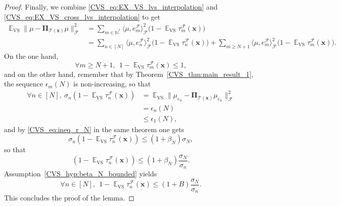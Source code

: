 \documentclass[twoside,11pt]{book}
\numberwithin{theorem}{chapter}
\numberwithin{definition}{chapter}
\numberwithin{proposition}{chapter}
\numberwithin{corollary}{chapter}
\numberwithin{example}{chapter}
\numberwithin{lemma}{chapter}
\numberwithin{assumption}{chapter}
\numberwithin{equation}{chapter}
\numberwithin{figure}{chapter}
\DeclareMathOperator{\VS}{\mathrm{VS}}
\DeclareMathOperator{\EX}{\mathbb{E}}
\DeclareMathOperator{\F}{\mathcal{F}}
\begin{document}
\begin{proof}
Finally, we combine \eqref{CVS_eq:EX_VS_lvs_interpolation} and \eqref{CVS_eq:EX_VS_cross_lvs_interpolation} to get
\begin{align}
\EX_{\VS}\|\mu - \bm{\Pi}_{\mathcal{T}(\bm{x})} \mu\|_{\F}^{2} & = \sum\limits_{m \in \mathbb{N}^{*}} \langle \mu, e_{m}^{\F} \rangle_{\F}^{2}\bigg(1- \EX_{\VS}\tau_{m}^{\F}(\bm{x})\bigg) \nonumber\\
& = \sum\limits_{n \in [N]} \langle \mu, e_{n}^{\F} \rangle_{\F}^{2}\bigg(1- \EX_{\VS}\tau_{n}^{\F}(\bm{x})\bigg) + \sum\limits_{m \geq N+1} \langle \mu, e_{m}^{\F} \rangle_{\F}^{2}\bigg(1- \EX_{\VS}\tau_{m}^{\F}(\bm{x})\bigg).
\end{align}
On the one hand,
\begin{equation}
\forall m \geq N+1, \:\: 1- \EX_{\VS}\tau_{m}^{\F}(\bm{x}) \leq 1,
\end{equation}
and on the other hand, remember that by Theorem~\ref{CVS_thm:main_result_1}, the sequence $\epsilon_{m}(N)$ is non-increasing, so that
\begin{align}
\forall n \in [N], \: \sigma_{n} (1-\EX_{\VS} \tau_{n}^{\F}(\bm{x})) & = \EX_{\VS} \|\mu_{e_{n}} - \bm{\Pi}_{\mathcal{T}(\bm{x})} \mu_{e_{n}}\|_{\F}^{2} \\
& = \epsilon_{n}(N) \\
& \leq \epsilon_{1}(N),
\end{align}
and by \eqref{CVS_eq:ineq_r_N} in the same theorem one gets
\begin{equation}
\sigma_{n} (1-\EX_{\VS} \tau_{n}^{\F}(\bm{x})) \leq (1+\beta_{N}) \sigma_{N},
\end{equation}
so that
\begin{equation}
 (1-\EX_{\VS} \tau_{n}^{\F}(\bm{x})) \leq (1+\beta_{N})\frac{ \sigma_{N}}{\sigma_{n}}.
\end{equation}
Assumption~\ref{CVS_hyp:beta_N_bounded} yields \
\begin{equation}
\forall n \in [N],\:\: 1- \EX_{\VS}\tau_{n}^{\F}(\bm{x}) \leq  (1+B) \frac{\sigma_{N}}{\sigma_{n}}.
\end{equation}
This concludes the proof of the lemma.
\end{proof}
\end{document}
